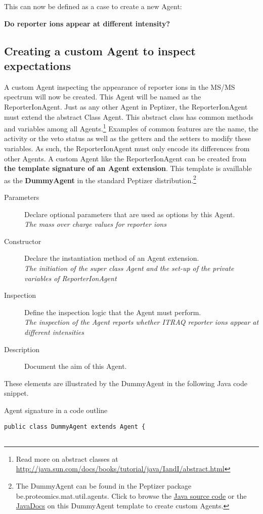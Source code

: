  \npar This can now be defined as a case to create a new Agent:\\{\textbf{Do \ITRAQ reporter ions appear at different intensity?}
%
\subsection{Creating a custom Agent to inspect expectations}
 \npar A custom Agent inspecting the appearance of \ITRAQ reporter ions in the MS/MS spectrum will now be created. This Agent will be named as the ReporterIonAgent. Just as any other Agent in Peptizer, the ReporterIonAgent must extend the abstract Class Agent. This abstract class has common methods and variables among all Agents.\footnote{Read more on abstract classes at \url{http://java.sun.com/docs/books/tutorial/java/IandI/abstract.html}} Examples of common features are the name, the activity or the veto status as well as the getters and the setters to modify these variables. As such, the ReporterIonAgent must only encode its differences from other Agents.
\npar A custom Agent like the ReporterIonAgent can be created from \textbf{the template signature of an Agent extension}. This template is availlable as the \textbf{DummyAgent} in the standard Peptizer distribution.\footnote{The DummyAgent can be found in the Peptizer package be.proteomics.mat.util.agents. Click to browse the \href{http://genesis.ugent.be/peptizer/xref/be/proteomics/mat/util/agents/DummyAgent.html}{Java source code} or the \href{http://genesis.ugent.be/peptizer/apidocs/be/proteomics/mat/util/agents/DummyAgent.html}{JavaDocs} on this DummyAgent template to create custom Agents.}
\begin{description}
\item[Parameters] Declare optional parameters that are used as options by this Agent.\\\textit{The mass over charge values for reporter ions}
\item[Constructor] Declare the instantiation method of an Agent extension.\\\textit{The initiation of the super class Agent and the set-up of the private variables of ReporterIonAgent}
\item[Inspection] Define the inspection logic that the Agent must perform.\\\textit{The inspection of the Agent reports whether ITRAQ reporter ions appear at different intensities}
\item[Description] Document the aim of this Agent.
 \end{description} 
 \npar These elements are illustrated by the DummyAgent in the following Java code snippet.
%
%
\begin{algorithm}[H]
\caption{Agent signature in a code outline}
\scriptsize
\vspace{0.3cm}
\begin{verbatim}
public class DummyAgent extends Agent {


\end{verbatim}
\end{algorithm}}
